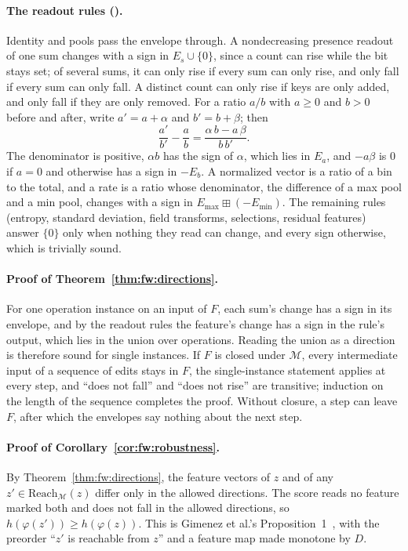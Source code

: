 \paragraph{The readout rules ().}
Identity and pools pass the envelope through. A nondecreasing presence readout of one sum changes with a sign in
$E_s \cup \{0\}$, since a count can rise while the bit stays set; of several sums, it can only rise if every sum can
only rise, and only fall if every sum can only fall. A distinct count can only rise if keys are only added, and only
fall if they are only removed. For a ratio $a/b$ with $a \ge 0$ and $b > 0$ before and after, write
$a' = a + \alpha$ and $b' = b + \beta$; then
\[
  \frac{a'}{b'} - \frac{a}{b} = \frac{\alpha\, b - a\, \beta}{b\, b'}.
\]
The denominator is positive, $\alpha b$ has the sign of $\alpha$, which lies in $E_a$, and $-a\beta$ is $0$ if
$a = 0$ and otherwise has a sign in $-E_b$. A normalized vector is a ratio of a bin to the total, and a rate is a ratio
whose denominator, the difference of a max pool and a min pool, changes with a sign in $E_{\max} \boxplus (-E_{\min})$.
The remaining rules (entropy, standard deviation, field transforms, selections, residual features) answer $\{0\}$ only
when nothing they read can change, and every sign otherwise, which is trivially sound.

\paragraph{Proof of Theorem~\ref{thm:fw:directions}.}
For one operation instance on an input of $F$, each sum's change has a sign in its envelope, and by the readout rules
the feature's change has a sign in the rule's output, which lies in the union over operations. Reading the union as a
direction is therefore sound for single instances. If $F$ is closed under $\mathcal{M}$, every intermediate input of a
sequence of edits stays in $F$, the single-instance statement applies at every step, and ``does not fall'' and ``does
not rise'' are transitive; induction on the length of the sequence completes the proof. Without closure, a step can
leave $F$, after which the envelopes say nothing about the next step.

\paragraph{Proof of Corollary~\ref{cor:fw:robustness}.}
By Theorem~\ref{thm:fw:directions}, the feature vectors of $z$ and of any $z' \in \mathrm{Reach}_\mathcal{M}(z)$ differ only
in the allowed directions. The score reads no feature marked both and does not fall in the allowed directions, so
$h(\varphi(z')) \ge h(\varphi(z))$. This is Gimenez et al.'s Proposition~1~\cite{gimenez2025certifiably}, with the
preorder ``$z'$ is reachable from $z$'' and a feature map made monotone by $D$.
